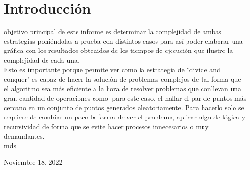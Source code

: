 \section{Introducción}
% 
% 
% 
% 
 objetivo principal de este informe es determinar la complejidad de ambas estrategias poniéndolas a prueba con distintos casos para así poder elaborar una gráfica con los resultados obtenidos de los tiempos de ejecución que ilustre la complejidad de cada una.\\

Esto es importante porque permite ver como la estrategia de "divide and conquer" es capaz de hacer la solución de problemas complejos de tal forma que el algoritmo sea más eficiente a la hora de resolver problemas que conllevan una gran cantidad de operaciones como, para este caso, el hallar el par de puntos más cercano en un conjunto de puntos generados aleatoriamente. Para hacerlo solo se requiere de cambiar un poco la forma de ver el problema, aplicar algo de lógica y recursividad de forma que se evite hacer procesos innecesarios o muy demandantes.\\


\hfill mds
 
\hfill Noviembre 18, 2022